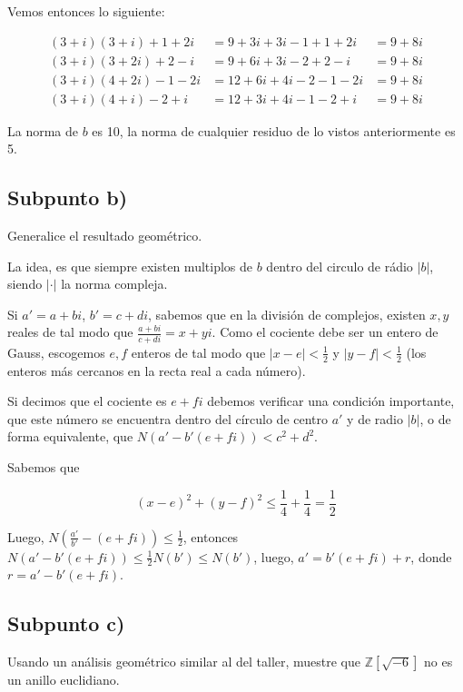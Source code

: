 \documentclass{article}
\begin{document}
      Vemos entonces lo siguiente:

      \begin{equation*}
        \begin{aligned}
          (3 + i)(3 + i) + 1 + 2i &= 9 + 3i + 3i - 1 + 1 + 2i &= 9 + 8i \\
          (3 + i)(3 + 2i) + 2 - i &= 9 + 6i + 3i - 2 + 2 - i  &= 9 + 8i \\
          (3 + i)(4 + 2i) -1 - 2i &= 12 + 6i + 4i - 2 - 1 -2i &= 9 + 8i \\
          (3 + i)(4 + i) -2 + i   &= 12 + 3i + 4i -1 - 2 + i  &= 9 + 8i
        \end{aligned}
      \end{equation*}

      La norma de $b$ es 10, la norma de cualquier residuo de lo vistos anteriormente es 5.

    \subsection{Subpunto b)}
      Generalice el resultado geométrico.


      La idea, es que siempre existen multiplos de $b$ dentro del circulo de rádio $|b|$, siendo $|\cdot|$ 
      la norma compleja.

      Si $a' = a + bi$, $b' = c + di$, sabemos que en la división de complejos, existen $x, y$ reales
      de tal modo que $\frac{a + bi}{c + di} = x + yi$. Como el cociente debe ser un entero de Gauss,
      escogemos $e, f$ enteros de tal modo que $|x - e| < \frac{1}{2}$ y $|y - f| < \frac{1}{2}$ (los
      enteros más cercanos en la recta real a cada número). 

      Si decimos que el cociente es $e + fi$ debemos verificar una condición importante, que este número 
      se encuentra dentro del círculo de centro $a'$ y de radio $|b|$, o de forma equivalente, que $N(a' - b'(e + fi)) < c^2 + d^2$.

      Sabemos que 

      \[
        (x - e)^2 + (y - f)^2 \leq \frac{1}{4} + \frac{1}{4} = \frac{1}{2}
      \]

      Luego, $N(\frac{a'}{b'} - (e + fi)) \leq \frac{1}{2}$, entonces $N(a' - b'(e + fi)) \leq \frac{1}{2}N(b') \leq N(b')$, 
      luego, $a' = b'(e + fi) + r$, donde $r = a' - b'(e + fi)$.

    \subsection{Subpunto c)}
      Usando un análisis geométrico similar al del taller, muestre que $\mathbb{Z}[\sqrt{-6}]$ no es 
      un anillo euclidiano.
\end{document}
